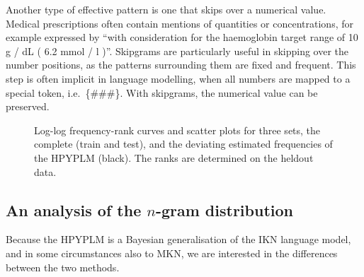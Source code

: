 Another type of effective pattern is one that skips over a numerical value. Medical prescriptions often contain mentions of quantities or concentrations, for example expressed by ``with consideration for the haemoglobin target range of 10 g / dL ( 6.2 mmol / l )''. Skipgrams are particularly useful in skipping over the number positions, as the patterns surrounding them are fixed and frequent. This step is often implicit in language modelling, when all numbers are mapped to a special token, i.e.\ \{\#\#\#\}. With skipgrams, the numerical value can be preserved.


\begin{figure*}
	\centering
	\caption{Log-log frequency-rank curves 
		and scatter plots for three sets, the complete \obw (train and test), and the deviating estimated frequencies of the HPYPLM (black). The ranks are determined on the heldout data.
		}\label{fig:freqs}
\end{figure*}

\subsection{An analysis of the $n$-gram distribution}
Because the HPYPLM is a Bayesian generalisation of the IKN language model, and in some circumstances also to MKN, we are interested in the differences between the two methods. 

